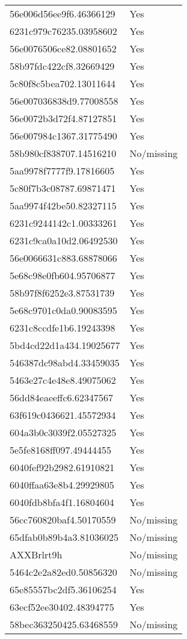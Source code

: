 \begin{tabular}{ll}
56e006d56ee9f6.46366129 & Yes \\
6231c979c76235.03958602 & Yes \\
56e0076506ce82.08801652 & Yes \\
58b97fdc422cf8.32669429 & Yes \\
5c80f8c5bea702.13011644 & Yes \\
56e007036838d9.77008558 & Yes \\
56e0072b3d72f4.87127851 & Yes \\
56e007984c1367.31775490 & Yes \\
58b980cf838707.14516210 & No/missing \\
5aa9978f7777f9.17816605 & Yes \\
5c80f7b3c08787.69871471 & Yes \\
5aa9974f42be50.82327115 & Yes \\
6231c9244142c1.00333261 & Yes \\
6231c9ca0a10d2.06492530 & Yes \\
56e0066631c883.68878066 & Yes \\
5e68c98e0fb604.95706877 & Yes \\
58b97f8f6252e3.87531739 & Yes \\
5e68c9701c0da0.90083595 & Yes \\
6231c8ccdfe1b6.19243398 & Yes \\
5bd4cd22d1a434.19025677 & Yes \\
546387dc98abd4.33459035 & Yes \\
5463e27c4e48e8.49075062 & Yes \\
56dd84eaeeffc6.62347567 & Yes \\
63f619c0436621.45572934 & Yes \\
604a3b0c3039f2.05527325 & Yes \\
5e5fe8168ff097.49444455 & Yes \\
6040fef92b2982.61910821 & Yes \\
6040ffaa63e8b4.29929805 & Yes \\
6040fdb8bfa4f1.16804604 & Yes \\
56cc760820baf4.50170559 & No/missing \\
65dfab0b89b4a3.81036025 & No/missing \\
AXXBrlrt9h & No/missing \\
5464c2e2a82ed0.50856320 & No/missing \\
65e85557bc2df5.36106254 & Yes \\
63ecf52ee30402.48394775 & Yes \\
58bec363250425.63468559 & No/missing \\

\end{tabular}
